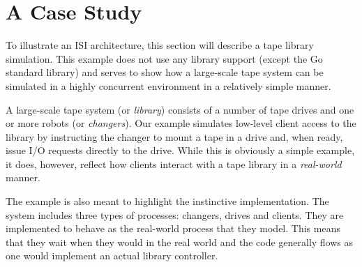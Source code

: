 \section{A Case Study}
\label{sec:case-study}

%
%
%
%
%
%
%
%

To illustrate an ISI architecture, this section will describe a tape library
simulation. This example does not use any library support (except the Go
standard library) and serves to show how a large-scale tape system can be
simulated in a highly concurrent environment in a relatively simple manner.

A large-scale tape system (or \emph{library}) consists of a number of tape
drives and one or more robots (or \emph{changers}). Our example simulates
low-level client access to the library by instructing the changer to mount a
tape in a drive and, when ready, issue I/O requests directly to the drive.
While this is obviously a simple example, it does, however, reflect how clients
interact with a tape library in a \emph{real-world} manner.

The example is also meant to highlight the instinctive implementation. The
system includes three types of processes: changers, drives and clients. They
are implemented to behave as the real-world process that they model. This means
that they wait when they would in the real world and the code generally flows
as one would implement an actual library controller.


